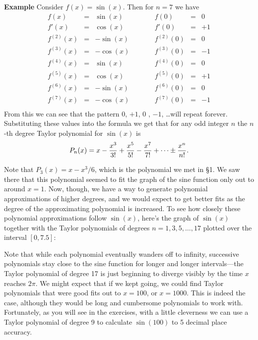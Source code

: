{{{{{\bf Example}  \hspace{.25in} Consider $f(x) = \sin(x)$. Then for $n=7$ we have 
\[
\begin{array}{rcrcrcr}
        f(x) &=& \sin(x) & \qquad & f(0) &=& 0 \\
        f'(x) &=& \cos(x) &             & f'(0) &=& +1 \\
        f^{(2)}(x) &=& -\sin(x) &       & f^{(2)}(0) &=& 0 \\
        f^{(3)}(x) &=& -\cos(x) &       & f^{(3)}(0) &=& -1 \\
        f^{(4)}(x) &=& \sin(x) &                & f^{(4)}(0) &=& 0 \\
        f^{(5)}(x) &=& \cos(x) &                & f^{(5)}(0) &=& +1 \\
        f^{(6)}(x) &=& -\sin(x) &       & f^{(6)}(0) &=& 0 \\
        f^{(7)}(x) &=& -\cos(x) &       & f^{(7)}(0) &=& -1 \\
        \end{array}
\]
From this we can see that the pattern 0, $+1$, 0 , $-1$, \ldots will repeat forever.  Substituting these values into the formula we get that for any odd integer $n$ the $n$-th degree Taylor polynomial for $\sin(x)$ is
        \[
P_n(x) =  x - {x^3 \over 3!} + {x^5 \over 5!} 
                - {x^7 \over 7!} + \cdots \pm {x^n \over n!}.
\]
        
Note that $P_3(x)=x-x^3/6$, which is the polynomial we met in \S1. We saw there that this polynomial seemed to fit the graph of the sine function only out to around $x=1$.  Now, though, we have a way to generate polynomial approximations of higher degrees, and we would expect to get better fits as the degree of the approximating polynomial is increased.  To see how closely these polynomial approximations follow $\sin(x)$, here's the graph of $\sin(x)$ together with the Taylor polynomials of degrees $n=1,3,5,\ldots ,17$ plotted over the interval $[0, 7.5]$:\label{sin3}

\vspace*{2.25in}

Note that while each polynomial eventually wanders off
 to infinity, successive polynomials stay close to the sine function for longer and longer intervals---the Taylor polynomial of degree 17 is just beginning to diverge visibly by the time $x$ reaches $2\pi$.  We might expect that if we kept going, we could find Taylor polynomials that were good fits out to $x=100$, or $x=1000$.  This is indeed the case, although they would be long and cumbersome polynomials to work with.  Fortunately, as you will see in the exercises, with a little cleverness we can use a Taylor polynomial of degree 9 to calculate $\sin(100)$ to 5 decimal place accuracy.

}}}}
